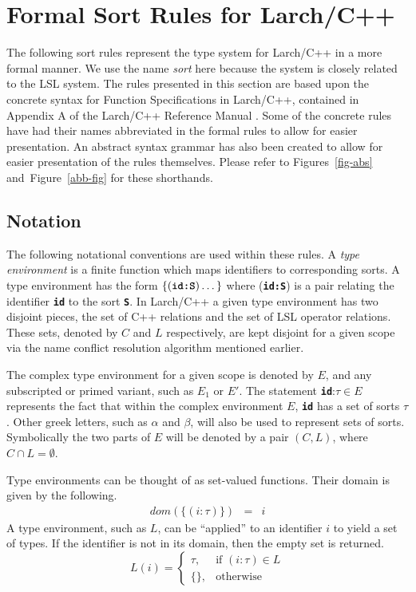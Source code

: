 \documentclass[12pt]{article} %
\newcommand{\reserved}[1]{\textbf{\texttt{#1}}} %
\begin{document}




\section{Formal Sort Rules for Larch/C++}
\label{typerules}


The following sort rules represent the type system for Larch/C++ in a
more formal manner. We use the name \emph{sort} here because the
system is closely related to the LSL system. The rules presented in
this section are based upon the concrete syntax for Function
Specifications in Larch/C++, contained in Appendix A of the Larch/C++
Reference Manual \cite{Leavens96c}. Some of the concrete rules have
had their names abbreviated in the formal rules to allow for easier
presentation. An abstract syntax grammar has also been created to
allow for easier presentation of the rules themselves. Please refer to
Figures~\ref{fig-abs} and~Figure~\ref{abb-fig} for these shorthands.



\subsection{Notation}
\label{trnot}
The following notational conventions are used within these
rules. A \emph{type environment} is a finite function
which maps identifiers to corresponding sorts. A type environment has
the form $\{(\reserved{id:S})\dots\}$ where (\reserved{id:S}) is a pair
relating the identifier \reserved{id} to the sort
\reserved{S}. In Larch/C++ a given type environment has two disjoint
pieces, the set of C++ relations and the set of LSL operator
relations. These sets, denoted by $C$ and $L$ respectively, are kept
disjoint for a given scope via the name conflict resolution algorithm
mentioned earlier.

The complex type environment for a given scope is denoted by $E$, and any subscripted or primed variant, such as
$E_1$ or $E'$. The statement \reserved{id}:$\tau \in E$ represents the fact that within the
complex environment $E$, \reserved{id} has a set of sorts $\tau$. Other greek
letters, such as $\alpha$ and $\beta$, will also be used to represent
sets of sorts.
Symbolically the two parts of $E$ will be denoted by a pair
$(C,L)$, where $C \cap L = \emptyset$.

Type environments can be thought of as set-valued functions.
Their domain is given by the following.
\begin{eqnarray}
dom(\{(i:\tau)\}) & = & i
\end{eqnarray}
A type environment, such as $L$,
can be ``applied'' to an identifier $i$ to yield a set
of types.  If the identifier is not in its domain, then the empty set is
returned.
\begin{equation}
L(i) = \left\{  \begin{array}{ll}
\tau, & \mbox{if $(i:\tau) \in L$} \\
\{\}, & \mbox{otherwise}
\end{array} \right.
\end{equation}
\end{document}
